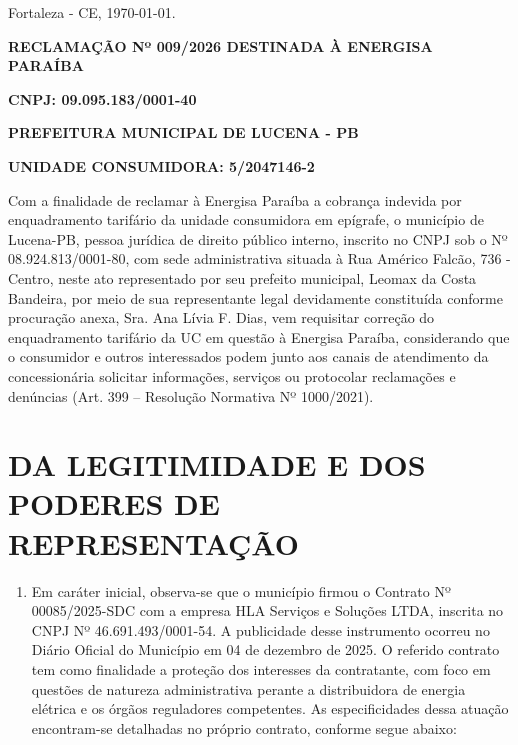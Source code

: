 \documentclass[11pt,a4paper]{article}
\newcommand{\numReclamacao}{009/2026} %
\newcommand{\unidadeConsumidora}{5/2047146-2} %
\newcommand{\siglaEstado}{PB} %
\newcommand{\nomeConcessionaria}{Energisa Paraíba} %
\newcommand{\nomeConcessionariaMaiuscula}{\MakeUppercase{\nomeConcessionaria}} %
\newcommand{\cnpjConcessionaria}{09.095.183/0001-40} %
\newcommand{\nomeMunicipio}{Lucena} %
\newcommand{\nomeMunicipioMaiuscula}{\MakeUppercase{\nomeMunicipio}} %
\newcommand{\cnpjMunicipio}{08.924.813/0001-80} %
\newcommand{\sedePrefeitura}{Rua Américo Falcão, 736 - Centro} %
\newcommand{\generoPrefeitura}{seu prefeito} %
\newcommand{\nomePrefeito}{Leomax da Costa Bandeira} %
\newcommand{\numeroContrato}{00085/2025-SDC} %
\newcommand{\publicacao}{Diário Oficial do Município} %
\newcommand{\dataPublicacao}{04 de dezembro de 2025} %
\begin{document}

\begin{flushright}
Fortaleza - CE, \today.
\end{flushright}

\textbf{RECLAMAÇÃO Nº \numReclamacao{} DESTINADA À \nomeConcessionariaMaiuscula{}}

\textbf{CNPJ: \cnpjConcessionaria{}}

\textbf{PREFEITURA MUNICIPAL DE \nomeMunicipioMaiuscula{} - \siglaEstado{}}

\textbf{UNIDADE CONSUMIDORA: \unidadeConsumidora{}}

\vspace{0.5cm}

Com a finalidade de reclamar à \nomeConcessionaria{} a cobrança indevida por enquadramento tarifário da unidade consumidora em epígrafe, o município de \nomeMunicipio{}-\siglaEstado{}, pessoa jurídica de direito público interno, inscrito no CNPJ sob o Nº \cnpjMunicipio{}, com sede administrativa situada à \sedePrefeitura{}, neste ato representado por \generoPrefeitura{} municipal, \nomePrefeito{}, por meio de sua representante legal devidamente constituída conforme procuração anexa, Sra. Ana Lívia F. Dias, vem requisitar correção do enquadramento tarifário da UC em questão à \nomeConcessionaria{}, considerando que o consumidor e outros interessados podem junto aos canais de atendimento da concessionária solicitar informações, serviços ou protocolar reclamações e denúncias (Art. 399 – Resolução Normativa Nº 1000/2021).



\section{DA LEGITIMIDADE E DOS PODERES DE REPRESENTAÇÃO}

\begin{enumerate}
\item
  Em caráter inicial, observa-se que o município firmou o Contrato Nº \numeroContrato{} com a empresa HLA Serviços e Soluções LTDA, inscrita no CNPJ Nº 46.691.493/0001-54. A publicidade desse instrumento ocorreu no \publicacao{} em \dataPublicacao{}. O referido contrato tem como finalidade a proteção dos interesses da contratante, com foco em questões de natureza administrativa perante a distribuidora de energia elétrica e os órgãos reguladores competentes. As especificidades dessa atuação encontram-se detalhadas no próprio contrato, conforme segue abaixo: 
\end{enumerate}
\end{document}
